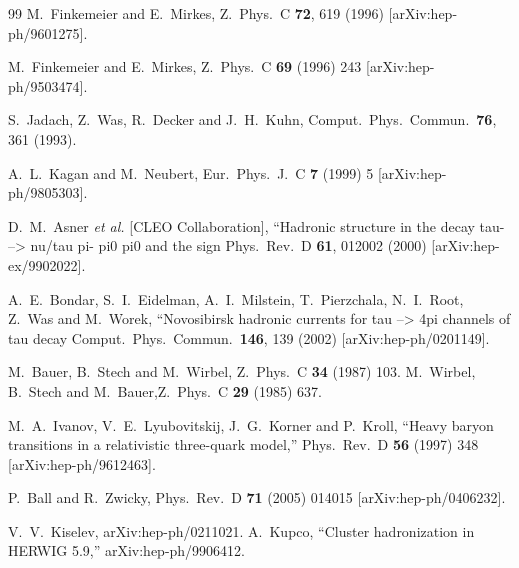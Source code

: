 \documentclass{article}
\begin{document}
\begin{thebibliography}{99}
  M.~Finkemeier and E.~Mirkes,
  Z.\ Phys.\  C {\bf 72}, 619 (1996)
  [arXiv:hep-ph/9601275].

M.~Finkemeier and E.~Mirkes,
Z.\ Phys.\  C {\bf 69} (1996) 243 [arXiv:hep-ph/9503474].

  S.~Jadach, Z.~Was, R.~Decker and J.~H.~Kuhn,
  Comput.\ Phys.\ Commun.\  {\bf 76}, 361 (1993).

 A.~L.~Kagan and M.~Neubert,
Eur.\ Phys.\ J.\  C {\bf 7} (1999) 5 [arXiv:hep-ph/9805303].

  D.~M.~Asner {\it et al.}  [CLEO Collaboration],
   ``Hadronic structure in the decay tau- --> nu/tau pi- pi0 pi0 and the  sign
  Phys.\ Rev.\  D {\bf 61}, 012002 (2000)
  [arXiv:hep-ex/9902022].

  A.~E.~Bondar, S.~I.~Eidelman, A.~I.~Milstein, T.~Pierzchala, N.~I.~Root, Z.~Was and M.~Worek,
   ``Novosibirsk hadronic currents for tau --> 4pi channels of tau decay
  Comput.\ Phys.\ Commun.\  {\bf 146}, 139 (2002)
  [arXiv:hep-ph/0201149].

 M.~Bauer, B.~Stech and M.~Wirbel,
Z.\ Phys.\  C {\bf 34} (1987) 103.
 M.~Wirbel, B.~Stech and M.~Bauer,Z.\ Phys.\  C {\bf 29} (1985) 637.

  M.~A.~Ivanov, V.~E.~Lyubovitskij, J.~G.~Korner and P.~Kroll,
  ``Heavy baryon transitions in a relativistic three-quark model,''
  Phys.\ Rev.\  D {\bf 56} (1997) 348
  [arXiv:hep-ph/9612463].

 P.~Ball and R.~Zwicky,
 Phys.\ Rev.\  D {\bf 71} (2005) 014015 [arXiv:hep-ph/0406232].

 V.~V.~Kiselev, arXiv:hep-ph/0211021.
  A.~Kupco,
  ``Cluster hadronization in HERWIG 5.9,''
  arXiv:hep-ph/9906412.


\end{thebibliography}
\end{document}
